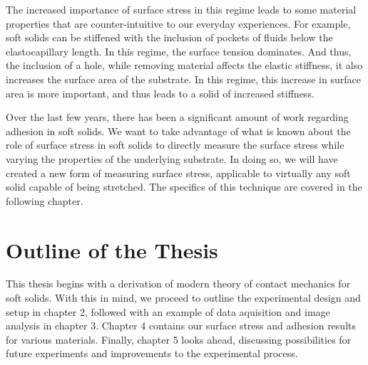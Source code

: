 The increased importance of surface stress in this regime leads to some material properties that are counter-intuitive to our everyday experiences. For example, soft solids can be stiffened with the inclusion of pockets of fluids below the elastocapillary length. In this regime, the surface tension dominates. And thus, the inclusion of a hole, while removing material affects the elastic stiffness, it also increases the surface area of the substrate. In this regime, this increase in surface area is more important, and thus leads to a solid of increased stiffness.

Over the last few years, there has been a significant amount of work regarding adhesion in soft solids. We want to take advantage of what is known about the role of surface stress in soft solids to directly measure the surface stress while varying the properties of the underlying substrate. In doing so, we will have created a new form of measuring surface stress, applicable to virtually any soft solid capable of being stretched. The specifics of this technique are covered in the following chapter.

\section{Outline of the Thesis}
This thesis begins with a derivation of modern theory of contact mechanics for soft solids. With this in mind, we proceed to outline the experimental design and setup in chapter 2, followed with an example of data aquisition and image analysis in chapter 3. Chapter 4 contains our surface stress and adhesion results for various materials. Finally, chapter 5 looks ahead, discussing possibilities for future experiments and improvements to the experimental process.